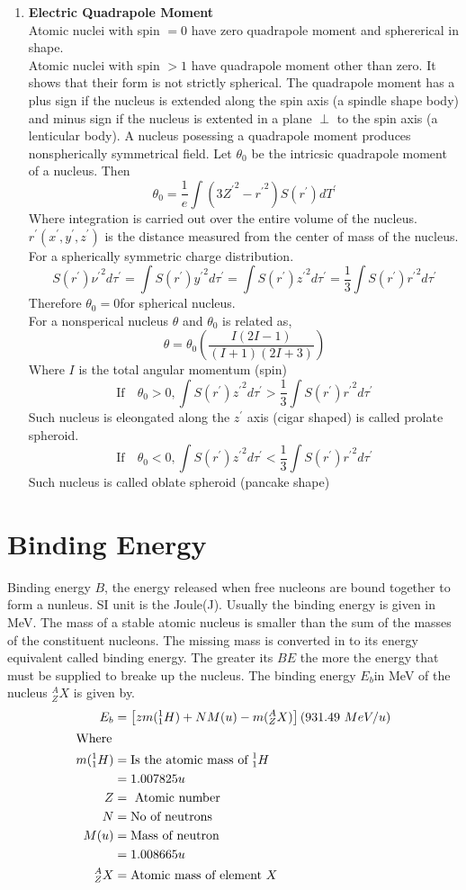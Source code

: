\begin{enumerate}
\item \textbf{Electric Quadrapole Moment}\\
Atomic nuclei with spin $=0$ have zero quadrapole moment and sphererical in shape. \\
Atomic nuclei with spin $>1$ have quadrapole moment other than zero. It shows that their form is not strictly spherical. The quadrapole moment has a plus sign if the nucleus is  extended along  the spin axis (a spindle shape body) and minus sign if the nucleus is extented in a plane $\perp$ to the spin axis (a lenticular body). A nucleus posessing a quadrapole moment produces nonspherically symmetrical field. Let $\theta_0$ be the intricsic quadrapole moment of a nucleus. Then 
$$\theta_0=\frac{1}{e}\int(3{Z^\prime}^2-{r^\prime}^2)S(r^\prime)dT^\prime$$
Where integration is carried out over the entire volume of the nucleus. $r^\prime(x^\prime,y^\prime,z^\prime
)$ is the distance measured from the center of mass of the nucleus.\\
For a spherically symmetric charge distribution.
$$S(r^\prime){\nu^\prime}^2d\tau^\prime=\int S(r^\prime){y^\prime}^2d\tau^\prime=\int S(r^\prime){z^\prime}^2d\tau^\prime=\frac{1}{3}\int S(r^\prime){r^\prime}^2d\tau^\prime$$
Therefore $\theta_0=0$for spherical nucleus.\\
For a nonsperical nucleus $\theta$ and $\theta_0$ is related as,
$$\theta=\theta_0\left( \frac{I(2I-1)}{(I+1)(2I+3)}\right) $$
Where $I$ is the total angular momentum (spin)
$$\text{If}\quad\theta_0>0, \int S(r^\prime){z^\prime}^2d\tau^\prime>\frac{1}{3}\int S(r^\prime){r^\prime}^2d\tau^\prime$$
Such nucleus is eleongated along the $z^\prime$ axis (cigar shaped) is called prolate spheroid.
$$\text{If}\quad\theta_0<0, \int S(r^\prime){z^\prime}^2d\tau^\prime<\frac{1}{3}\int S(r^\prime){r^\prime}^2d\tau^\prime$$
Such nucleus is called oblate spheroid (pancake shape)
\end{enumerate}
\section{Binding Energy}
Binding energy $B$, the energy released when free nucleons are bound together to form a nunleus. SI unit is the Joule(J). Usually the binding energy is given in MeV. The mass of a stable atomic nucleus is smaller than the sum of the masses of the constituent nucleons. The missing mass is converted in to its energy equivalent called binding energy. The greater its $BE$ the more the energy that must be supplied to breake up the nucleus. The binding energy $E_b$in MeV  of the nucleus $^A_ZX$ is given by.
\begin{align*}
E_b&=\left[ zm(^1_1H)+NM(u)-m(^A_ZX)\right]\left(931.49\  MeV/u \right)  \\
\intertext{Where}
m(^1_1H)&=\text{Is the atomic mass of }^1_1H\\
&=1.007825 u\\
Z&= \text{ Atomic number}\\
N&= \text{No of neutrons}\\
M(u)&=\text{Mass of neutron}\\
&=1.008665 u\\
^A_ZX&= \text{Atomic mass of element }X
\end{align*}
